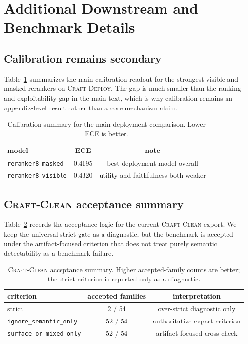 \section{Additional Downstream and Benchmark Details}

\subsection{Calibration remains secondary}

Table~\ref{tab:appendix_calibration} summarizes the main calibration readout
for the strongest visible and masked rerankers on \textsc{Craft-Deploy}. The
gap is much smaller than the ranking and exploitability gap in the main text,
which is why calibration remains an
appendix-level result rather than a core mechanism claim.

\begin{table}[h]
\centering
\caption{Calibration summary for the main deployment comparison. Lower ECE is
better.}
\label{tab:appendix_calibration}
\small
\begin{tabular}{lcc}
\toprule
model & ECE & note \\
\midrule
\texttt{reranker8\_masked} & 0.4195 & best deployment model overall \\
\texttt{reranker8\_visible} & 0.4320 & utility and faithfulness both weaker \\
\bottomrule
\end{tabular}
\end{table}

\subsection{\textsc{Craft-Clean} acceptance summary}

Table~\ref{tab:appendix_acceptance} records the acceptance logic for the
current \textsc{Craft-Clean} export. We keep the universal strict gate as a
diagnostic, but the benchmark is accepted under the artifact-focused criterion
that does not treat purely semantic detectability as a benchmark failure.

\begin{table}[h]
\centering
\caption{\textsc{Craft-Clean} acceptance summary. Higher accepted-family counts
are better; the strict criterion is reported only as a diagnostic.}
\label{tab:appendix_acceptance}
\small
\begin{tabular}{lcc}
\toprule
criterion & accepted families & interpretation \\
\midrule
strict & 2 / 54 & over-strict diagnostic only \\
\texttt{ignore\_semantic\_only} & 52 / 54 & authoritative export criterion \\
\texttt{surface\_or\_mixed\_only} & 52 / 54 & artifact-focused cross-check \\
\bottomrule
\end{tabular}
\end{table}

